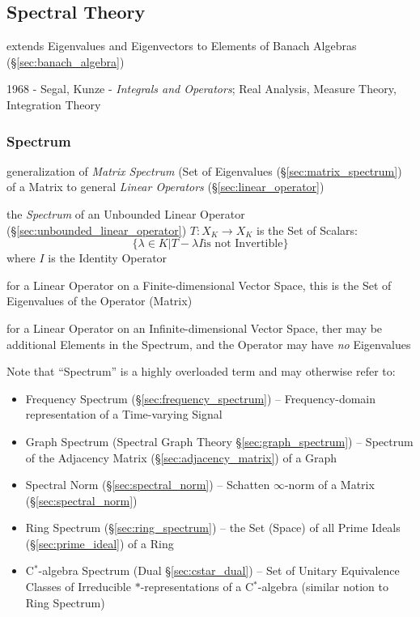 {%
\subsection{Spectral Theory}\label{sec:spectral_theory}

extends Eigenvalues and Eigenvectors to Elements of Banach Algebras
(\S\ref{sec:banach_algebra})

1968 - Segal, Kunze - \emph{Integrals and Operators}; Real Analysis, Measure
Theory, Integration Theory



\subsubsection{Spectrum}\label{sec:spectrum}

\fist generalization of \emph{Matrix Spectrum} (Set of Eigenvalues
(\S\ref{sec:matrix_spectrum}) of a Matrix to general \emph{Linear Operators}
(\S\ref{sec:linear_operator})

the \emph{Spectrum} of an Unbounded Linear Operator
(\S\ref{sec:unbounded_linear_operator}) $T : X_K \to X_K$ is the Set of Scalars:
\[
  \{ \lambda \in K | T - \lambda I \text{is not Invertible} \}
\]
where $I$ is the Identity Operator

for a Linear Operator on a Finite-dimensional Vector Space, this is the Set of
Eigenvalues of the Operator (Matrix)

for a Linear Operator on an Infinite-dimensional Vector Space, ther may be
additional Elements in the Spectrum, and the Operator may have \emph{no}
Eigenvalues

\fist Note that ``Spectrum'' is a highly overloaded term and may otherwise
refer to:
\begin{itemize}
  \item Frequency Spectrum (\S\ref{sec:frequency_spectrum}) -- Frequency-domain
    representation of a Time-varying Signal
  \item Graph Spectrum (Spectral Graph Theory \S\ref{sec:graph_spectrum}) --
    Spectrum of the Adjacency Matrix (\S\ref{sec:adjacency_matrix}) of a Graph

  \item Spectral Norm (\S\ref{sec:spectral_norm}) -- Schatten $\infty$-norm of
    a Matrix (\S\ref{sec:spectral_norm})

  \item Ring Spectrum (\S\ref{sec:ring_spectrum}) -- the Set (Space) of all
    Prime Ideals (\S\ref{sec:prime_ideal}) of a Ring
  \item C$^*$-algebra Spectrum (Dual \S\ref{sec:cstar_dual}) -- Set of Unitary
    Equivalence Classes of Irreducible $*$-representations of a C$^*$-algebra
    (similar notion to Ring Spectrum)


\end{itemize}}
